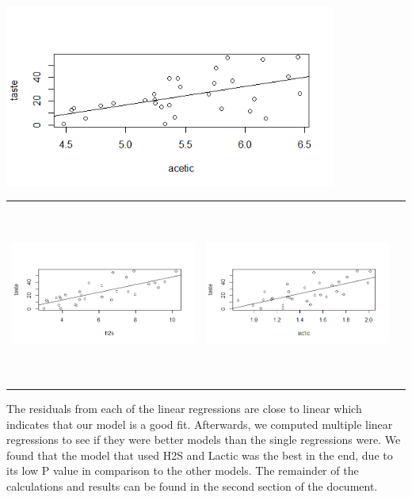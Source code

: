 \documentclass[12pt]{article}
\begin{document}
\begin{doublespace}
	\begin{center}
	\includegraphics[width=.5\textwidth, height=60mm, keepaspectratio]{images/1155/1155_acetic_taste_linreg.png}\par
	\begin{tabular}{ccc}
		\includegraphics[width=.5\textwidth, height=60mm, keepaspectratio]{images/1156/h2s_taste_linear_regression.png}\par & 	\includegraphics[width=.5\textwidth, height=60mm, keepaspectratio]{images/1157/taste_lactic_linear_regression.png}\par\\
	\end{tabular}
	\end{center}\par
		The residuals from each of the linear regressions are close to linear which indicates that our model is a good fit. Afterwards, we computed multiple linear regressions to see if they were better models than the single regressions were. We found that the model that used H2S and Lactic was the best in the end, due to its low P value in comparison to the other models. The remainder of the calculations and results can be found in the second section of the document.\par
	\end{doublespace}
\end{document}
